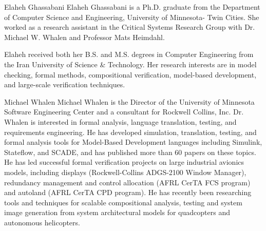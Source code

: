 \documentclass[10pt,journal,compsoc]{IEEEtran}
\begin{document}



\begin{IEEEbiography}{Elaheh Ghassabani}
Elaheh Ghassabani is a Ph.D. graduate from the Department of Computer Science and Engineering, University of Minnesota- Twin Cities. She worked as a research assistant in the Critical Systems Research Group with Dr. Michael W. Whalen and Professor Mats Heimdahl.

Elaheh received both her B.S. and M.S. degrees in Computer Engineering from the Iran University of Science \& Technology. Her research interests are in model checking, formal methods, compositional verification, model-based development, and large-scale verification techniques.

\end{IEEEbiography}

\begin{IEEEbiography}{Michael Whalen}
Michael Whalen is the Director of the University of Minnesota Software Engineering Center and a consultant for Rockwell Collins, Inc.  Dr. Whalen is interested in formal analysis, language translation, testing, and requirements engineering.  He has developed simulation, translation, testing, and formal analysis tools for Model-Based Development languages including Simulink, Stateflow, and SCADE, and has published more than 60 papers on these topics.  He has led successful formal verification projects on large industrial avionics models, including displays (Rockwell-Collins ADGS-2100 Window Manager), redundancy management and control allocation (AFRL CerTA FCS program) and autoland (AFRL CerTA CPD program).  He has recently been researching tools and techniques for scalable compositional analysis, testing and system image generation from system architectural models for quadcopters and autonomous helicopters.
\end{IEEEbiography}
\end{document}
